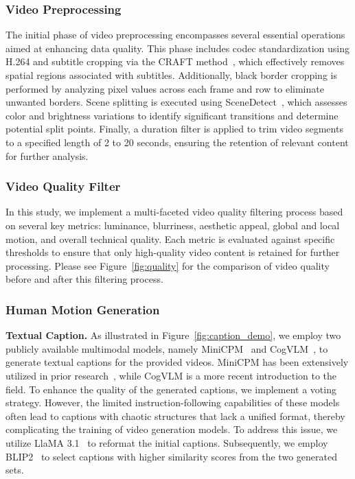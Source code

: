 \subsubsection{Video Preprocessing}
The initial phase of video preprocessing encompasses several essential operations aimed at enhancing data quality. 
This phase includes codec standardization using H.264 and subtitle cropping via the CRAFT method~\cite{baek2019character}, which effectively removes spatial regions associated with subtitles.
Additionally, black border cropping is performed by analyzing pixel values across each frame and row to eliminate unwanted borders. Scene splitting is executed using SceneDetect~\cite{PySceneDetect}, which assesses color and brightness variations to identify significant transitions and determine potential split points. Finally, a duration filter is applied to trim video segments to a specified length of 2 to 20 seconds, ensuring the retention of relevant content for further analysis.

\subsubsection{Video Quality Filter}

In this study, we implement a multi-faceted video quality filtering process based on several key metrics: luminance, blurriness, aesthetic appeal, global and local motion, and overall technical quality. Each metric is evaluated against specific thresholds to ensure that only high-quality video content is retained for further processing.
Please see Figure~\ref{fig:quality} for the comparison of video quality before and after this filtering process.

\subsubsection{Human Motion Generation}
\label{sec:human_motion}
\noindent\textbf{Textual Caption.}
As illustrated in Figure~\ref{fig:caption_demo}, we employ two publicly available multimodal models, namely MiniCPM~\cite{yao2024minicpm} and CogVLM~\cite{hong2024cogvlm2}, to generate textual captions for the provided videos. 
MiniCPM has been extensively utilized in prior research~\cite{chen2024multi}, while CogVLM is a more recent introduction to the field. 
To enhance the quality of the generated captions, we implement a voting strategy. 
However, the limited instruction-following capabilities of these models often lead to captions with chaotic structures that lack a unified format, thereby complicating the training of video generation models. 
To address this issue, we utilize LlaMA 3.1~\cite{dubey2024LlaMA} to reformat the initial captions. 
Subsequently, we employ BLIP2~\cite{li2023blip} to select captions with higher similarity scores from the two generated sets.

